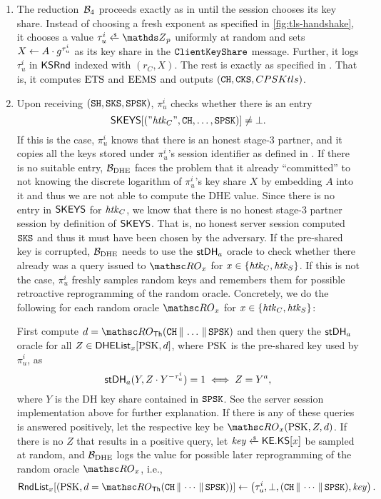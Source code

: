 	\begin{enumerate}
		\item The reduction~$\mathcal{B}_4$ proceeds exactly as in \thisGame until the session chooses its key share.
		Instead of choosing a fresh exponent as specified in \autoref{fig:tls-handshake}, it chooses a value $\tau_u^i \sample \Z_p$ uniformly at random and sets $X \gets A \cdot g^{\tau_u^i}$ as its key share in the $\mathtt{ClientKeyShare}$ message.
		Further, it logs $\tau_u^i$ in $\mathsf{KSRnd}$ indexed with $(r_C, X)$.
		The rest is exactly as specified in \thisGame. 
		That is, it computes $\mathrm{ETS}$ and $\mathrm{EEMS}$ and outputs $(\mathtt{CH}, \mathtt{CKS}, \\CPSKtls)$.
		\item 	Upon receiving $(\mathtt{SH},\mathtt{SKS}, \mathtt{SPSK})$, $\pi_u^i$ checks whether there is an entry 
		\[
		\mathsf{SKEYS}[("\mathit{htk}_C",\mathtt{CH}, \dotsc, \mathtt{SPSK})] \neq \bot.
		\]
		If this is the case, $\pi_u^i$ knows that there is an honest stage-$3$ partner, and it copies all the keys stored under $\pi_u^i$'s session identifier as defined in \thisGame.
		If there is no suitable entry, $\mathcal{B}_{\mathrm{DHE}}$ faces the problem that it already ``committed'' to not knowing the discrete logarithm of $\pi_u^i$'s key share $X$ by embedding $A$ into it and thus we are not able to compute the DHE value.
		Since there is no entry in $\mathsf{SKEYS}$ for $\mathit{htk}_C$, we know that there is no honest stage-$3$ partner session by definition of $\mathsf{SKEYS}$.
		That is, no honest server session computed $\mathtt{SKS}$ and thus it must have been chosen by the adversary.
		If the pre-shared key is corrupted, $\mathcal{B}_{\mathrm{DHE}}$ needs to use the $\mathsf{stDH}_a$ oracle to check whether there already was a query issued to $\RO_x$ for $x \in \{\mathit{htk}_C, \mathit{htk}_S\}$.
		If this is not the case, $\pi_u^i$ freshly samples random keys and remembers them for possible retroactive reprogramming of the random oracle.
		Concretely, we do the following for each random oracle $\RO_{x}$ for $x \in \{\mathit{htk}_C, \mathit{htk}_S\}$:
		
		First compute $d = \RO_\Thash(\CH \concat \dotsc \concat \SPSKtls)$ and then query the $\mathsf{stDH}_a$ oracle for all $Z \in \mathsf{DHEList}_x[\mathrm{PSK}, d]$, where $\mathrm{PSK}$ is the pre-shared key used by $\pi_u^i$, as
		\[
		\mathsf{stDH}_a(Y, Z \cdot Y^{-\tau_u^i}) = 1 \iff Z = Y^a,
		\]
		where $Y$ is the DH key share contained in $\mathtt{SPSK}$.
		See the server session implementation above for further explanation.
		If there is any of these queries is answered positively, let the respective key be $\RO_{x}(\psk, Z, d)$.
		If there is no $Z$ that results in a positive query, let $\mathit{key} \sample \KEkeyspace[x]$ be sampled at random, and $\mathcal{B}_{\mathrm{DHE}}$ logs the value for possible later reprogramming of the random oracle $\RO_{x}$, i.e.,
		\[
		\rndTable_x[(\psk, d = \RO_\Thash(\CH \concat \dotsb \concat \SPSKtls) )] \assign \left(  \tau_u^i, \bot, (\CH \concat \dotsb \concat \SPSKtls), \mathit{key} \right).
		\]
		

\end{enumerate}
